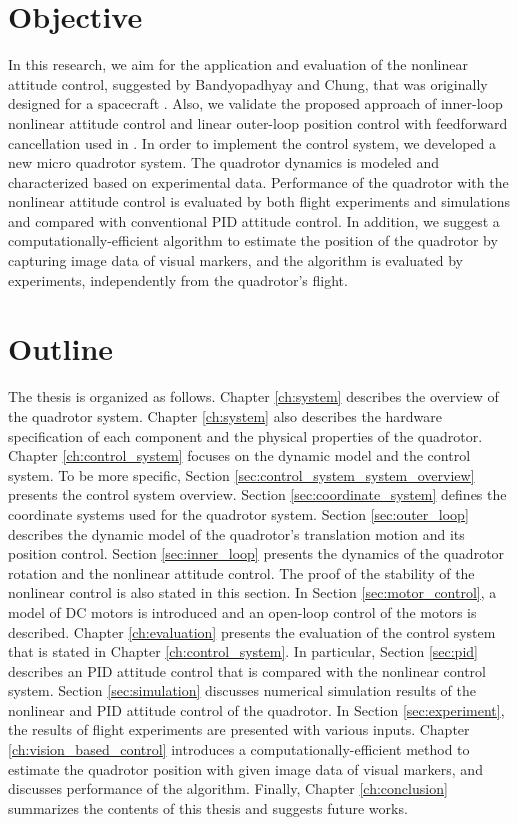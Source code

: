 \section{Objective}

In this research, we aim for the application and evaluation of the nonlinear attitude control, suggested by Bandyopadhyay and Chung, that was originally designed for a spacecraft \cite{Bandyopadhyay16}. %
Also, we validate the proposed approach of inner-loop nonlinear attitude control and linear outer-loop position control with feedforward cancellation used in \cite{Morgan16}. In order to implement the control system, we developed a new micro quadrotor system. The quadrotor dynamics is modeled and characterized based on experimental data. Performance of the quadrotor with the nonlinear attitude control is evaluated by both flight experiments and simulations and compared with conventional PID attitude control. In addition, we suggest a computationally-efficient algorithm to estimate the position of the quadrotor by capturing image data of visual markers, and the algorithm is evaluated by experiments, independently from the quadrotor's flight.

\section{Outline}

The thesis is organized as follows. Chapter \ref{ch:system} describes the overview of the quadrotor system. Chapter \ref{ch:system} also describes the hardware specification of each component and the physical properties of the quadrotor. Chapter \ref{ch:control_system} focuses on the dynamic model and the control system. To be more specific, Section \ref{sec:control_system_system_overview} presents the control system overview. Section \ref{sec:coordinate_system} defines the coordinate systems used for the quadrotor system. Section \ref{sec:outer_loop} describes the dynamic model of the quadrotor's translation motion and its position control. Section \ref{sec:inner_loop} presents the dynamics of the quadrotor rotation and the nonlinear attitude control. The proof of the stability of the nonlinear control is also stated in this section. In Section \ref{sec:motor_control}, a model of DC motors is introduced and an open-loop control of the motors is described. Chapter \ref{ch:evaluation} presents the evaluation of the control system that is stated in Chapter \ref{ch:control_system}. In particular, Section \ref{sec:pid} describes an PID attitude control that is compared with the nonlinear control system. Section \ref{sec:simulation} discusses numerical simulation results of the nonlinear and PID attitude control of the quadrotor. In Section \ref{sec:experiment}, the results of flight experiments are presented with various inputs. Chapter \ref{ch:vision_based_control} introduces a computationally-efficient method to estimate the quadrotor position with given image data of visual markers, and discusses performance of the algorithm. Finally, Chapter \ref{ch:conclusion} summarizes the contents of this thesis and suggests future works.